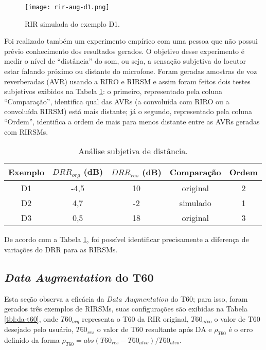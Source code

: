 \begin{figure} [H]
    \centering
    \texttt{[image: rir-aug-d1.png]}
    \caption{RIR simulada do exemplo D1.}
    \label{fig:rir-aug-d1}
\end{figure} 

Foi realizado também um experimento empírico com uma pessoa que não possui prévio conhecimento dos resultados gerados.
O objetivo desse experimento é medir o nível de “distância” do som, ou seja, a sensação subjetiva do locutor estar falando próximo ou distante
do microfone.
Foram geradas amostras de voz reverberadas (AVR) usando a RIRO e RIRSM e assim foram feitos dois testes subjetivos exibidos na Tabela \ref{tbl:drr-exp}:
o primeiro, representado pela coluna “Comparação”, identifica qual das AVRs (a convoluída com RIRO ou a convoluída RIRSM) está mais distante;
já o segundo, representado pela coluna “Ordem”, identifica a ordem de mais para menos distante entre as AVRs geradas com RIRSMs.

\begin{table} [H]
    \centering
    \caption{Análise subjetiva de distância.}
    \label{tbl:drr-exp}
    \begin{tabular}{c|c|c|c|c}

        \textbf{Exemplo} & 
        \textbf{$DRR_{org}$ (dB)} & 
        \textbf{$DRR_{res}$ (dB)} & 
        \textbf{Comparação} &
        \textbf{Ordem} \\
        \hline 

        D1 & -4,5 & 10 & original & 2 \\
        D2 & 4,7 & -2 & simulado & 1 \\
        D3 & 0,5 & 18 & original & 3 \\

    \end{tabular}
\end{table}

De acordo com a Tabela \ref{tbl:drr-exp}, foi possível identificar precisamente a diferença de variações do DRR para as RIRSMs.


\subsection{\textit{Data Augmentation} do T60}

Esta seção observa a eficácia da \textit{Data Augmentation} do T60; para isso, foram gerados três exemplos de RIRSMs, suas configurações
são exibidas na Tabela \ref{tbl:da-t60}, onde $T60_{org}$ representa o T60 da RIR original, $T60_{alvo}$ o valor de T60 desejado pelo usuário,
$T60_{res}$ o valor de T60 resultante após DA e $\rho_{T60}$ é o erro definido da forma $\rho_{T60} = abs(T60_{res} - T60_{alvo})/T60_{alvo}$.

